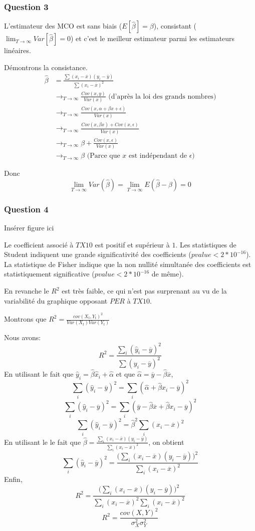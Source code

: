 \documentclass[a4paper,12pt]{article}
\newcommand{\betahat}{\hat{\beta}}
\newcommand{\alphahat}{\hat{\alpha}}
\newcommand{\yhat}{\hat{y}}
\newcommand{\xhat}{\hat{x}}
\newcommand{\ybar}{\overline{y}}
\newcommand{\xbar}{\overline{x}}
\begin{document}
\subsubsection*{Question 3}
L'estimateur des MCO est sans biais ($E[\betahat] = \beta$), consistant ($\lim_{T \rightarrow \infty} Var[\betahat] = 0$) et c'est le meilleur estimateur parmi les estimateurs linéaires.

Démontrons la consistance.
\begin{equation*}
\begin{split}
  \betahat &= \frac{\sum (x_i - \xbar) (y_i - \ybar)}{\sum (x_i - \xbar)^2 }\\
           & \longrightarrow_{T \rightarrow \infty} \frac{Cov(x, y)}{Var(x)} \text{ (d'après la loi des grands nombres)}\\
           &\longrightarrow_{T \rightarrow \infty}  \frac{Cov(x, \alpha + \beta x + \epsilon)}{Var(x)}\\
           & \longrightarrow_{T \rightarrow \infty}  \frac{Cov(x, \beta x) + Cov(x, \epsilon)}{Var(x)}\\
           & \longrightarrow_{T \rightarrow \infty}  \beta + \frac{Cov(x, \epsilon)}{Var(x)}\\
           & \longrightarrow_{T \rightarrow \infty}  \beta \text{ (Parce que $x$ est indépendant de $\epsilon$)}
\end{split}
\end{equation*}

Donc
$$ \lim_{T \rightarrow \infty} Var(\betahat) = \lim_{T \rightarrow \infty} E(\betahat - \beta) = 0$$

\subsubsection*{Question 4}
Insérer figure ici

Le coefficient associé à $TX10$ est positif et supérieur à $1$.
Les statistiques de Student indiquent une grande significativité  des coefficients ($pvalue <2*10^{-16}$). La statistique de Fisher indique que la non nullité simultanée des coefficients est statistiquement significative ($pvalue <2*10^{-16}$ de même).

En revanche le $R^2$ est très faible, ce qui n'est pas surprenant au vu de la variabilité du graphique opposant $PER$ à $TX10$.

Montrons que $R^2 = \frac{cov(X_t,Y_t)^2}{Var(X_t)Var(Y_t)}$

Nous avons:
$$ R^2 = \frac{\sum_i{(\yhat_i - \ybar)^2}}{\sum{(y_i - \ybar)^2}} $$
En utilisant le fait que $\yhat_i = \betahat \xhat_i + \alphahat$ et que $\alphahat = \ybar - \betahat \xbar$,
$$ \sum_i{(\yhat_i - \ybar)^2} = \sum_i{(\alphahat + \betahat x_i - \ybar)^2} $$
$$ \sum_i{(\yhat_i - \ybar)^2} = \sum_i{(\ybar - \betahat \xbar + \betahat x_i - \ybar)^2} $$
$$ \sum_i{(\yhat_i - \ybar)^2} = \betahat^2 \sum_i{(x_i - \xbar)^2} $$
En utilisant le le fait que  $\betahat = \frac{\sum_i{(x_i-\xbar)(y_i-\ybar)}}{\sum_i(x_i-\xbar)^2}$, on obtient
$$ \sum_i{(\yhat_i - \ybar)^2} = \frac{(\sum_i{(x_i-\xbar)(y_i-\ybar))^2}}{\sum_i(x_i-\xbar)^2}$$
Enfin,
$$R^2 = \frac{(\sum_i{(x_i-\xbar)(y_i-\ybar))^2}}{\sum_i(x_i-\xbar)^2 \sum_i(x_i-\xbar)^2}$$
$$R^2 = \frac{cov(X,Y)^2}{\sigma_X^2 \sigma_Y^2} $$
\end{document}
